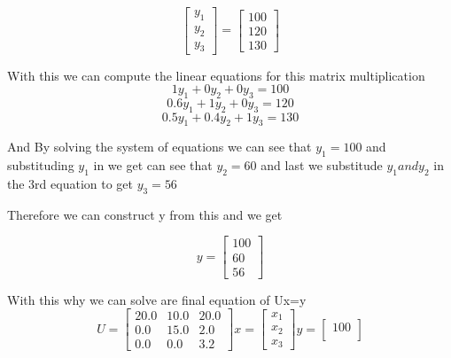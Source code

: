 \documentclass{article}
\begin{document}
\begin{enumerate}
\[      \begin{bmatrix}
        y_1 \\
        y_2 \\
        y_3
      \end{bmatrix}
      =
      \begin{bmatrix}
        100 \\
        120 \\
        130 
      \end{bmatrix}
    \]
    \par
    With this we can compute the linear equations for this matrix multiplication
    \begin{equation}
      1y_1+0y_2+0y_3 = 100
    \end{equation}
    \begin{equation}
      0.6y_1+1y_2+0y_3 = 120
    \end{equation}
    \begin{equation}
      0.5y_1+0.4y_2+1y_3 = 130
    \end{equation}
    \par
    And By solving the system of equations we can see that $y_1 = 100$ and substituding $y_1$ in we get can see that $y_2 = 60$ and last we substitude $y_1 and y_2$ in the 3rd equation to get $y_3 = 56$
    \par
    Therefore we can construct y from this and we get
    \begin{center}
      \[
        y = 
        \begin{bmatrix}
          100 \\
          60 \\
          56
        \end{bmatrix}
      \]
    \end{center}
    \par
    With this why we can solve are final equation of Ux=y
    \[
      U = 
      \begin{bmatrix}
        20.0 & 10.0 & 20.0 \\
        0.0 & 15.0 & 2.0 \\
        0.0 & 0.0 & 3.2 
      \end{bmatrix}
      x = 
      \begin{bmatrix}
        x_1 \\
        x_2 \\
        x_3 
      \end{bmatrix}
      y = 
      \begin{bmatrix}
        100 \\

\end{bmatrix}\]
\end{enumerate}
\end{document}
